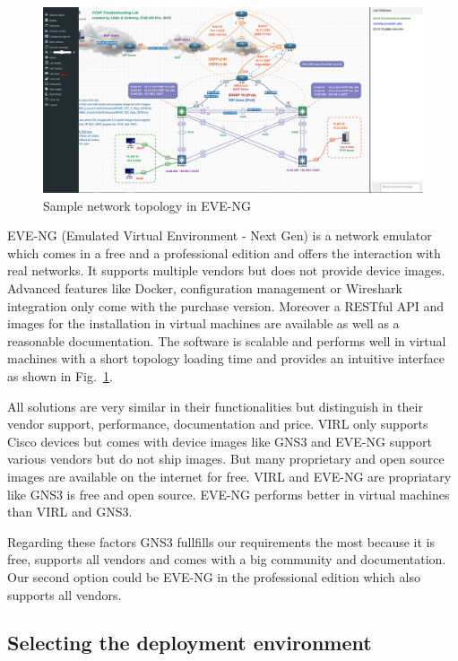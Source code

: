 \documentclass[conference]{IEEEtran}
\begin{document}
\begin{figure}[htbp]
\centerline{\includegraphics[scale=0.19]{eve-ng.png}}
\caption{Sample network topology in EVE-NG \cite{b6}}
\label{eve-ng}
\end{figure}

EVE-NG (Emulated Virtual Environment - Next Gen) is a network emulator which comes in a free and a professional edition and offers the interaction with real networks. It supports multiple vendors but does not provide device images. Advanced features like Docker, configuration management or Wireshark integration only come with the purchase version. Moreover a RESTful API and images for the installation in virtual machines are available as well as a reasonable documentation. The software is scalable and performs well in virtual machines with a short topology loading time and provides an intuitive interface as shown in Fig.~\ref{eve-ng}.  \cite{b1} \cite{b7}

All solutions are very similar in their functionalities but distinguish in their vendor support, performance, documentation and price. VIRL only supports Cisco devices but comes with device images like GNS3 and EVE-NG support various vendors but do not ship images. But many proprietary and open source images are available on the internet for free. VIRL and EVE-NG are propriatary like GNS3 is free and open source. EVE-NG performs better in virtual machines than VIRL and GNS3.

Regarding these factors GNS3 fullfills our requirements the most because it is free, supports all vendors and comes with a big community and documentation. Our second option could be EVE-NG in the professional edition which also supports all vendors.

\subsection{Selecting the deployment environment}
\end{document}

